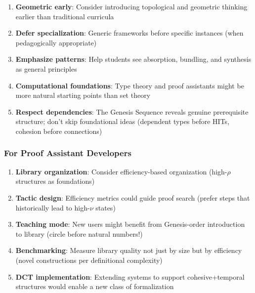 \documentclass[11pt]{article}
\theoremstyle{definition}
\begin{document}
\begin{enumerate}
\item \textbf{Geometric early}: Consider introducing topological and geometric thinking earlier than traditional curricula

\item \textbf{Defer specialization}: Generic frameworks before specific instances (when pedagogically appropriate)

\item \textbf{Emphasize patterns}: Help students see absorption, bundling, and synthesis as general principles

\item \textbf{Computational foundations}: Type theory and proof assistants might be more natural starting points than set theory

\item \textbf{Respect dependencies}: The Genesis Sequence reveals genuine prerequisite structure; don't skip foundational ideas (dependent types before HITs, cohesion before connections)
\end{enumerate}

\subsubsection{For Proof Assistant Developers}

\begin{enumerate}
\item \textbf{Library organization}: Consider efficiency-based organization (high-$\rho$ structures as foundations)

\item \textbf{Tactic design}: Efficiency metrics could guide proof search (prefer steps that historically lead to high-$\nu$ states)

\item \textbf{Teaching mode}: New users might benefit from Genesis-order introduction to library (circle before natural numbers!)

\item \textbf{Benchmarking}: Measure library quality not just by size but by efficiency (novel constructions per definitional complexity)

\item \textbf{DCT implementation}: Extending systems to support cohesive+temporal structures would enable a new class of formalization
\end{enumerate}
\end{document}
